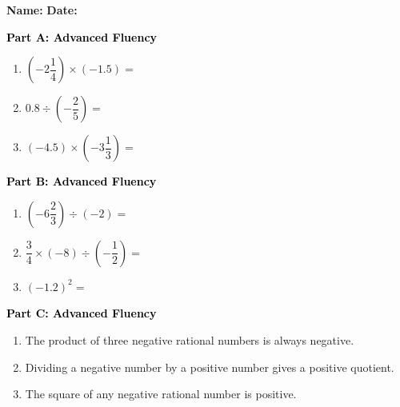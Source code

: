 \documentclass[12pt, letterpaper, fleqn]{article}
\begin{document}
\textbf{Name:} \underline{\hspace{5cm}}
\hfill
\textbf{Date:} \underline{\hspace{3cm}}\\

\begin{tcolorbox}[colback=customteal!20]
\large\textcolor{black}{\textbf{Part A: Advanced Fluency}}
\end{tcolorbox}

\vspace{3mm}

\begin{enumerate}[itemsep=5.5cm, leftmargin=0.6cm]
\item $\left(-2\dfrac{1}{4}\right) \times \left(-1.5\right) =$
\item $0.8 \div \left(-\dfrac{2}{5}\right) =$
\item $\left(-4.5\right) \times \left(-3\dfrac{1}{3}\right) =$
\end{enumerate}

\newpage

\begin{tcolorbox}[colback=customteal!20]
\large\textcolor{black}{\textbf{Part B: Advanced Fluency}}
\end{tcolorbox}

\vspace{3mm}

\begin{enumerate}[itemsep=5.5cm, leftmargin=0.6cm, resume]
\item $\left(-6\dfrac{2}{3}\right) \div \left(-2\right) =$
\item $\dfrac{3}{4} \times (-8) \div \left(-\dfrac{1}{2}\right) =$
\item $(-1.2)^2 =$
\end{enumerate}

\newpage

\begin{tcolorbox}[colback=customteal!20]
\large\textcolor{black}{\textbf{Part C: Advanced Fluency}}
\end{tcolorbox}

\vspace{3mm}

\begin{enumerate}[itemsep=5.5cm, leftmargin=0.6cm, resume]
\item The product of three negative rational numbers is always negative.
\item Dividing a negative number by a positive number gives a positive quotient.
\item The square of any negative rational number is positive.
\end{enumerate}
\end{document}
